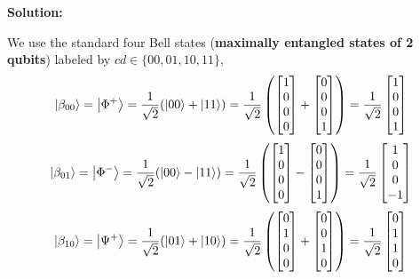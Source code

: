 \documentclass[11pt]{article}
\newenvironment{solution}
{\par\noindent\textbf{Solution:}\par}
{\vspace{1em}}
\begin{document}
\begin{solution}
We use the standard four Bell states (\textbf{maximally entangled states of 2 qubits}) labeled by $cd \in \{00,01,10,11\}$,
\[
\ket{\beta_{00}} = \ket{\Phi^+} = \frac{1}{\sqrt{2}}(\ket{00} + \ket{11}) = \frac{1}{\sqrt{2}} \left (\begin{bmatrix}1\\0\\0\\0\end{bmatrix} + \begin{bmatrix}0\\0\\0\\1\end{bmatrix} \right) = \frac{1}{\sqrt{2}} \begin{bmatrix}1\\0\\0\\1\end{bmatrix}
\]
\[\ket{\beta_{01}} = \ket{\Phi^-} = \frac{1}{\sqrt{2}}(\ket{00} - \ket{11}) = \frac{1}{\sqrt{2}} \left (\begin{bmatrix}1\\0\\0\\0\end{bmatrix} - \begin{bmatrix}0\\0\\0\\1\end{bmatrix} \right) = \frac{1}{\sqrt{2}} \begin{bmatrix}1\\0\\0\\-1\end{bmatrix}
\]
\[\ket{\beta_{10}} = \ket{\Psi^+} = \frac{1}{\sqrt{2}}(\ket{01} + \ket{10}) = \frac{1}{\sqrt{2}} \left (\begin{bmatrix}0\\1\\0\\0\end{bmatrix} + \begin{bmatrix}0\\0\\1\\0\end{bmatrix} \right) = \frac{1}{\sqrt{2}} \begin{bmatrix}0\\1\\1\\0\end{bmatrix}
\]
\end{solution}
\end{document}
